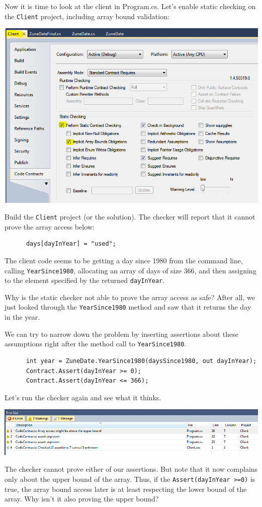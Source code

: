 \documentclass{article}
\newcommand{\code}[1]{\lstinline{#1}}
\begin{document}
Now it is time to look at the client in Program.cs. Let's enable
static checking on the \code{Client} project, including array bound
validation:
\begin{center}
  \includegraphics[width=1\columnwidth]{pane2.png}
\end{center}
Build the \code{Client} project (or the solution). The checker will
report that it cannot prove the array access below:
\begin{lstlisting}
      days[dayInYear] = "used";
\end{lstlisting}
The client code seems to be getting a day since 1980 from the command
line, calling \code{YearSince1980}, allocating an array of days of
size 366, and then assigning to the element specified by the returned
\code{dayInYear}.

Why is the static checker not able to prove the array access as safe?
After all, we just looked through the \code{YearSince1980} method and
saw that it returns the day in the year.

We can try to narrow down the problem by inserting assertions about
these assumptions right after the method call to \code{YearSince1980}.
\begin{lstlisting}
      int year = ZuneDate.YearSince1980(daysSince1980, out dayInYear);
      Contract.Assert(dayInYear >= 0);
      Contract.Assert(dayInYear <= 366);
\end{lstlisting}
Let's run the checker again and see what it thinks.
\begin{center}
  \includegraphics[width=1\columnwidth]{errors4.png}
\end{center}
The checker cannot prove either of our assertions. But note that it
now complains only about the upper bound of the array. Thus, if the
\code{Assert(dayInYear >=0)} is true, the array bound access later is
at least respecting the lower bound of the array. Why isn't it also
proving the upper bound?
\end{document}
